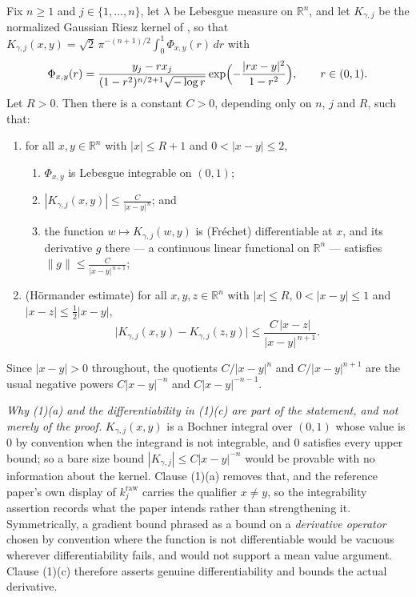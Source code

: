 \begin{lemma}
Fix $n \geq 1$ and $j \in \{1,\ldots,n\}$, let $\lambda$ be Lebesgue measure on
$\mathbb{R}^n$, and let $K_{\gamma,j}$ be the normalized Gaussian Riesz kernel
of , so that
$K_{\gamma,j}(x,y) = \sqrt2\,\pi^{-(n+1)/2}\int_0^1\Phi_{x,y}(r)\,dr$ with
\[
  \Phi_{x,y}(r)
    = \frac{y_j - r x_j}{(1-r^2)^{n/2+1}\sqrt{-\log r}}
      \exp\Bigl(-\frac{|rx-y|^2}{1-r^2}\Bigr),
  \qquad r \in (0,1) .
\]
Let $R > 0$.  Then there is a constant $C > 0$, depending only on $n$, $j$ and
$R$, such that:
\begin{enumerate}
\item for all $x,y \in \mathbb{R}^n$ with $|x| \leq R+1$ and
$0 < |x-y| \leq 2$,
  \begin{enumerate}
  \item $\Phi_{x,y}$ is Lebesgue integrable on $(0,1)$;
  \item $\displaystyle |K_{\gamma,j}(x,y)| \leq \frac{C}{|x-y|^{\,n}}$; and
  \item the function $w \mapsto K_{\gamma,j}(w,y)$ is (Fr\'echet)
    differentiable at $x$, and its derivative $g$ there --- a continuous linear
    functional on $\mathbb{R}^n$ --- satisfies
    $\displaystyle \|g\| \leq \frac{C}{|x-y|^{\,n+1}}$;
  \end{enumerate}
\item (H\"ormander estimate) for all $x,y,z \in \mathbb{R}^n$ with
$|x| \leq R$, $0 < |x-y| \leq 1$ and $|x-z| \leq \tfrac12|x-y|$,
\[
  \bigl|K_{\gamma,j}(x,y) - K_{\gamma,j}(z,y)\bigr|
    \leq \frac{C\,|x-z|}{|x-y|^{\,n+1}} .
\]
\end{enumerate}
Since $|x-y| > 0$ throughout, the quotients $C/|x-y|^n$ and $C/|x-y|^{n+1}$ are
the usual negative powers $C|x-y|^{-n}$ and $C|x-y|^{-n-1}$.

\emph{Why (1)(a) and the differentiability in (1)(c) are part of the statement,
and not merely of the proof.}  $K_{\gamma,j}(x,y)$ is a Bochner integral over
$(0,1)$ whose value is $0$ by convention when the integrand is not integrable,
and $0$ satisfies every upper bound; so a bare size bound $|K_{\gamma,j}| \leq
C|x-y|^{-n}$ would be provable with no information about the kernel.  Clause
(1)(a) removes that, and the reference paper's own display of
$k_j^{\mathrm{raw}}$ carries the qualifier $x \neq y$, so the integrability
assertion records what the paper intends rather than strengthening it.
Symmetrically, a gradient bound phrased as a bound on a \emph{derivative
operator} chosen by convention where the function is not differentiable would
be vacuous wherever differentiability fails, and would not support a mean value
argument.  Clause (1)(c) therefore asserts genuine differentiability and bounds
the actual derivative.


\end{lemma}
